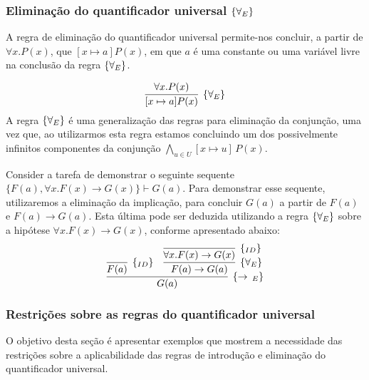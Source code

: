 \subsubsection{Eliminação do quantificador universal $\scriptsize{\{\forall_E}\}$}

A regra de eliminação do quantificador universal permite-nos concluir,
a partir de $\forall x. P(x)$, que $[x\mapsto a]P(x)$, em que $a$ é uma
constante ou uma variável livre na conclusão da regra $\scriptsize{\{\forall_E}\}$.

\[
\infer[\forallE]{[x\mapsto a]P(x)}
                      {\forall x. P(x)}
\]
A regra $\scriptsize{\{\forall_E}\}$ é uma generalização das regras para eliminação da
conjunção, uma vez que, ao utilizarmos esta regra estamos concluindo
um dos possivelmente infinitos componentes da conjunção
$\bigwedge_{u\in U}[x\mapsto u]\,P(x)$.
\begin{Example}
Consider a tarefa de demonstrar o seguinte sequente $\{F(a),\forall
x. F(x) \to G(x)\} \vdash G(a)$. Para demonstrar esse sequente,
utilizaremos a eliminação da implicação, para concluir $G(a)$ a partir
de $F(a)$ e $F(a) \to G(a)$. Esta última pode ser deduzida utilizando
a regra $\scriptsize{\{\forall_E}\}$ sobre a hipótese $\forall x. F(x) \to G(x)$,
conforme apresentado abaixo:
\[
\infer[\impE]{G(a)}
        {\infer[\Id]{F(a)}{} &
         \infer[\forallE]{F(a) \to G(a)} {
           \infer[\Id]{\forall x. F(x)\to G(x)}{}
                  }}
\]
\end{Example}

\subsubsection{Restrições sobre as regras do quantificador universal}

O objetivo desta seção é apresentar exemplos que mostrem a necessidade
das restrições sobre a aplicabilidade das regras de introdução e
eliminação do quantificador universal.

